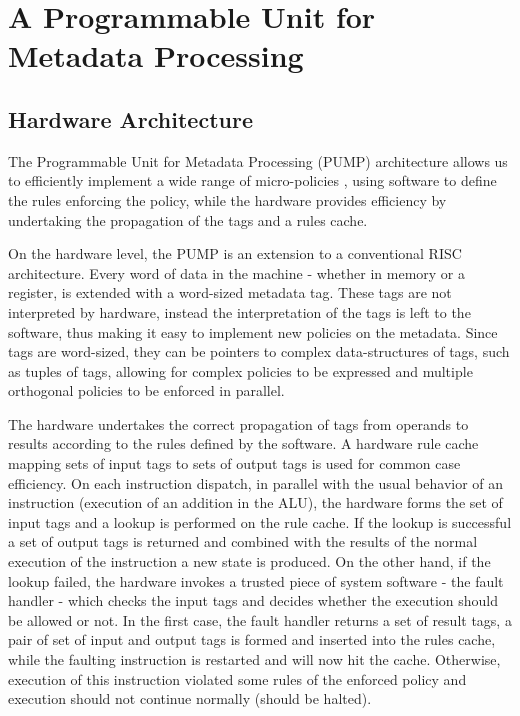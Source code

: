 
\section{A Programmable Unit for Metadata Processing}\label{sec:pump}


\subsection{Hardware Architecture}

The Programmable Unit for Metadata Processing (PUMP) architecture
\cite{pump_hasp2014} allows us to efficiently implement a wide range
of micro-policies \cite{pump_asplos2015}, using software to define
the rules enforcing the policy, while the hardware provides efficiency
by undertaking the propagation of the tags and a rules cache.

On the hardware level, the PUMP is an extension to a conventional RISC
architecture. Every word of data in the machine - whether in memory or
a register, is extended with a word-sized metadata tag.  These tags
are not interpreted by hardware, instead the interpretation of the
tags is left to the software, thus making it easy to implement new
policies on the metadata. Since tags are word-sized, they can be
pointers to complex data-structures of tags, such as tuples of tags,
allowing for complex policies to be expressed and multiple orthogonal
policies to be enforced in parallel.

The hardware undertakes the correct propagation of tags from operands
to results according to the rules defined by the software. A hardware
rule cache mapping sets of input tags to sets of output tags is used
for common case efficiency. On each instruction dispatch, in parallel
with the usual behavior of an instruction (\EG execution of an
addition in the ALU), the hardware forms the set of input tags and a
lookup is performed on the rule cache. If the lookup is successful a
set of output tags is returned and combined with the results of the
normal execution of the instruction a new state is produced. On the
other hand, if the lookup failed, the hardware invokes a trusted piece
of system software - the fault handler - which checks the input tags
and decides whether the execution should be allowed or not. In the
first case, the fault handler returns a set of result tags, a pair of
set of input and output tags is formed and inserted into the rules
cache, while the faulting instruction is restarted and will now hit
the cache. Otherwise, execution of this instruction violated some
rules of the enforced policy and execution should not continue
normally (\EG should be halted).


